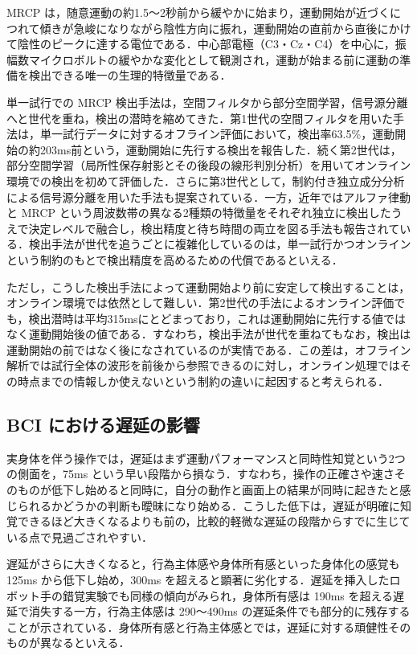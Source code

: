 \documentclass[twoside]{wiss}
\begin{document}
MRCP は，随意運動の約1.5〜2秒前から緩やかに始まり，運動開始が近づくにつれて傾きが急峻になりながら陰性方向に振れ，運動開始の直前から直後にかけて陰性のピークに達する電位である．中心部電極（C3・Cz・C4）を中心に，振幅数マイクロボルトの緩やかな変化として観測され，運動が始まる前に運動の準備を検出できる唯一の生理的特徴量である．

単一試行での MRCP 検出手法は，空間フィルタから部分空間学習，信号源分離へと世代を重ね，検出の潜時を縮めてきた．第1世代の空間フィルタを用いた手法は，単一試行データに対するオフライン評価において，検出率63.5\%，運動開始の約203ms前という，運動開始に先行する検出を報告した\cite{niazi2011}．続く第2世代は，部分空間学習（局所性保存射影とその後段の線形判別分析）を用いてオンライン環境での検出を初めて評価した\cite{xu2014}．さらに第3世代として，制約付き独立成分分析による信号源分離を用いた手法も提案されている\cite{karimi2017}．一方，近年ではアルファ律動と MRCP という周波数帯の異なる2種類の特徴量をそれぞれ独立に検出したうえで決定レベルで融合し，検出精度と待ち時間の両立を図る手法も報告されている\cite{liu2024}．検出手法が世代を追うごとに複雑化しているのは，単一試行かつオンラインという制約のもとで検出精度を高めるための代償であるといえる．

ただし，こうした検出手法によって運動開始より前に安定して検出することは，オンライン環境では依然として難しい．第2世代の手法によるオンライン評価でも，検出潜時は平均315msにとどまっており，これは運動開始に先行する値ではなく運動開始後の値である\cite{xu2014}．すなわち，検出手法が世代を重ねてもなお，検出は運動開始の前ではなく後になされているのが実情である．この差は，オフライン解析では試行全体の波形を前後から参照できるのに対し，オンライン処理ではその時点までの情報しか使えないという制約の違いに起因すると考えられる．

\subsection{BCI における遅延の影響}

実身体を伴う操作では，遅延はまず運動パフォーマンスと同時性知覚という2つの側面を，75ms という早い段階から損なう．すなわち，操作の正確さや速さそのものが低下し始めると同時に，自分の動作と画面上の結果が同時に起きたと感じられるかどうかの判断も曖昧になり始める\cite{waltemate2016}．こうした低下は，遅延が明確に知覚できるほど大きくなるよりも前の，比較的軽微な遅延の段階からすでに生じている点で見過ごされやすい．

遅延がさらに大きくなると，行為主体感や身体所有感といった身体化の感覚も 125ms から低下し始め，300ms を超えると顕著に劣化する\cite{waltemate2016}．遅延を挿入したロボット手の錯覚実験でも同様の傾向がみられ，身体所有感は 190ms を超える遅延で消失する一方，行為主体感は 290〜490ms の遅延条件でも部分的に残存することが示されている\cite{ismail2016}．身体所有感と行為主体感とでは，遅延に対する頑健性そのものが異なるといえる．
\end{document}
